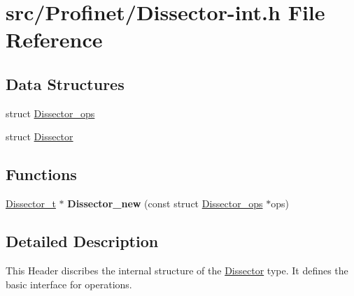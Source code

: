 \hypertarget{_dissector-int_8h}{\section{src/\-Profinet/\-Dissector-\/int.h File Reference}
\label{_dissector-int_8h}
}
\subsection*{Data Structures}
\begin{DoxyCompactItemize}
\item 
struct \hyperlink{struct_dissector__ops}{Dissector\-\_\-ops}
\item 
struct \hyperlink{struct_dissector}{Dissector}
\end{DoxyCompactItemize}
\subsection*{Functions}
\begin{DoxyCompactItemize}
\item 
\hypertarget{_dissector-int_8h_af20c51477bd3b35a08e9558f011367ae}{\hyperlink{struct_dissector}{Dissector\-\_\-t} $\ast$ {\bfseries Dissector\-\_\-new} (const struct \hyperlink{struct_dissector__ops}{Dissector\-\_\-ops} $\ast$ops)}\label{_dissector-int_8h_af20c51477bd3b35a08e9558f011367ae}

\end{DoxyCompactItemize}


\subsection{Detailed Description}
This Header discribes the internal structure of the \hyperlink{struct_dissector}{Dissector} type. It defines the basic interface for operations. 